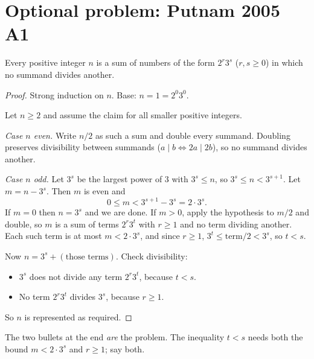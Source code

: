 \documentclass[11pt]{article}
\begin{document}
\section*{Optional problem: Putnam 2005 A1}

\begin{claim}
Every positive integer $n$ is a sum of numbers of the form $2^r 3^s$ ($r, s \ge 0$) in which no summand divides another.
\end{claim}
\begin{proof}
Strong induction on $n$. Base: $n = 1 = 2^0 3^0$.

Let $n \ge 2$ and assume the claim for all smaller positive integers.

\emph{Case $n$ even.} Write $n/2$ as such a sum and double every summand. Doubling preserves divisibility between summands ($a \mid b \iff 2a \mid 2b$), so no summand divides another.

\emph{Case $n$ odd.} Let $3^s$ be the largest power of $3$ with $3^s \le n$, so $3^s \le n < 3^{s+1}$. Let $m = n - 3^s$. Then $m$ is even and
\[ 0 \le m < 3^{s+1} - 3^s = 2 \cdot 3^s. \]
If $m = 0$ then $n = 3^s$ and we are done. If $m > 0$, apply the hypothesis to $m/2$ and double, so $m$ is a sum of terms $2^r 3^t$ with $r \ge 1$ and no term dividing another. Each such term is at most $m < 2\cdot 3^s$, and since $r \ge 1$, $3^t \le \text{term}/2 < 3^s$, so $t < s$.

Now $n = 3^s + (\text{those terms})$. Check divisibility:
\begin{itemize}
  \item $3^s$ does not divide any term $2^r 3^t$, because $t < s$.
  \item No term $2^r 3^t$ divides $3^s$, because $r \ge 1$.
\end{itemize}
So $n$ is represented as required.
\end{proof}

\begin{gradingnote}\leavevmode
The two bullets at the end \emph{are} the problem. The inequality $t < s$ needs both the bound $m < 2 \cdot 3^s$ and $r \ge 1$; say both.
\end{gradingnote}
\end{document}
